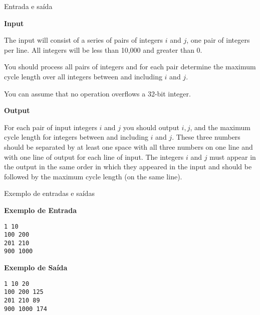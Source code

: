 \begin{frame}[fragile]{Entrada e saída}

\textbf{Input}

The input will consist of a series of pairs of integers $i$ and $j$, one pair of integers per line. All integers will be less than 10,000 and greater than 0.

You should process all pairs of integers and for each pair determine the maximum cycle length over
all integers between and including $i$ and $j$.

You can assume that no operation overflows a 32-bit integer.

\vspace{0.1in}

\textbf{Output}

For each pair of input integers $i$ and $j$ you should output $i, j$, and the maximum cycle length 
for integers between and including $i$ and $j$. These three numbers should be separated by at 
least one space with all three numbers on one line and with one line of output for each line of 
input. The integers $i$ and $j$ must
appear in the output in the same order in which they appeared in the input and should be followed by
the maximum cycle length (on the same line).

\end{frame}

\begin{frame}[fragile]{Exemplo de entradas e saídas}

\begin{minipage}[t]{0.5\textwidth}
\textbf{Exemplo de Entrada}
\begin{verbatim}
1 10
100 200
201 210
900 1000
\end{verbatim}
\end{minipage}
\begin{minipage}[t]{0.45\textwidth}
\textbf{Exemplo de Saída}
\begin{verbatim}
1 10 20
100 200 125
201 210 89
900 1000 174
\end{verbatim}
\end{minipage}
\end{frame}

